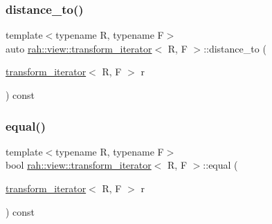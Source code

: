 \mbox{\label{structrah_1_1view_1_1transform__iterator_ae0919c95985ebca42017346da790c981}} 
\subsubsection{\texorpdfstring{distance\_to()}{distance\_to()}\hspace{0.1cm}{\footnotesize\ttfamily [2/2]}}
{\footnotesize\ttfamily template$<$typename R, typename F$>$ \\
auto \mbox{\hyperlink{structrah_1_1view_1_1transform__iterator}{rah\+::view\+::transform\+\_\+iterator}}$<$ R, F $>$\+::distance\+\_\+to (\begin{DoxyParamCaption}\item[{\mbox{\hyperlink{structrah_1_1view_1_1transform__iterator}{transform\+\_\+iterator}}$<$ R, F $>$}]{r }\end{DoxyParamCaption}) const\hspace{0.3cm}{\ttfamily [inline]}}

\mbox{\label{structrah_1_1view_1_1transform__iterator_a68105373ae5ce99863589e17605f3833}} 
\subsubsection{\texorpdfstring{equal()}{equal()}\hspace{0.1cm}{\footnotesize\ttfamily [1/2]}}
{\footnotesize\ttfamily template$<$typename R, typename F$>$ \\
bool \mbox{\hyperlink{structrah_1_1view_1_1transform__iterator}{rah\+::view\+::transform\+\_\+iterator}}$<$ R, F $>$\+::equal (\begin{DoxyParamCaption}\item[{\mbox{\hyperlink{structrah_1_1view_1_1transform__iterator}{transform\+\_\+iterator}}$<$ R, F $>$}]{r }\end{DoxyParamCaption}) const\hspace{0.3cm}{\ttfamily [inline]}}

